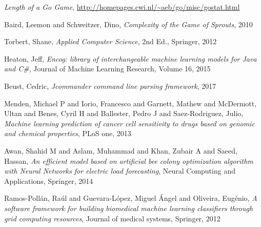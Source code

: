 \documentclass[12pt]{report}
\begin{document}
\begin{thebibliography}{99}
 \emph{Length of a Go Game}, \url{http://homepages.cwi.nl/~aeb/go/misc/gostat.html}

 Baird, Leemon and Schweitzer, Dino, \emph{Complexity of the Game of Sprouts}, 2010

 Torbert, Shane, \emph{Applied Computer Science}, 2nd Ed., Springer, 2012

 Heaton, Jeff, \emph{Encog: library of interchangeable machine learning models for Java and C\#}, Journal of Machine Learning Research, Volume 16, 2015 

 Beust, Cedric, \emph{Jcommander command line parsing framework}, 2017

 Menden, Michael P and Iorio, Francesco and Garnett, Mathew and McDermott, Ultan and Benes, Cyril H and Ballester, Pedro J and Saez-Rodriguez, Julio, \emph{Machine learning prediction of cancer cell sensitivity to drugs based on genomic and chemical properties}, PLoS one, 2013

 Awan, Shahid M and Aslam, Muhammad and Khan, Zubair A and Saeed, Hassan, \emph{An efficient model based on artificial bee colony optimization algorithm with Neural Networks for electric load forecasting}, Neural Computing and Applications, Springer, 2014

 Ramos-Poll{\'a}n, Ra{\'u}l and Guevara-L{\'o}pez, Miguel {\'A}ngel and Oliveira, Eug{\'e}nio, \emph{A software framework for building biomedical machine learning classifiers through grid computing resources}, Journal of medical systems, Springer, 2012

\end{thebibliography}

%



% 

\end{document}
